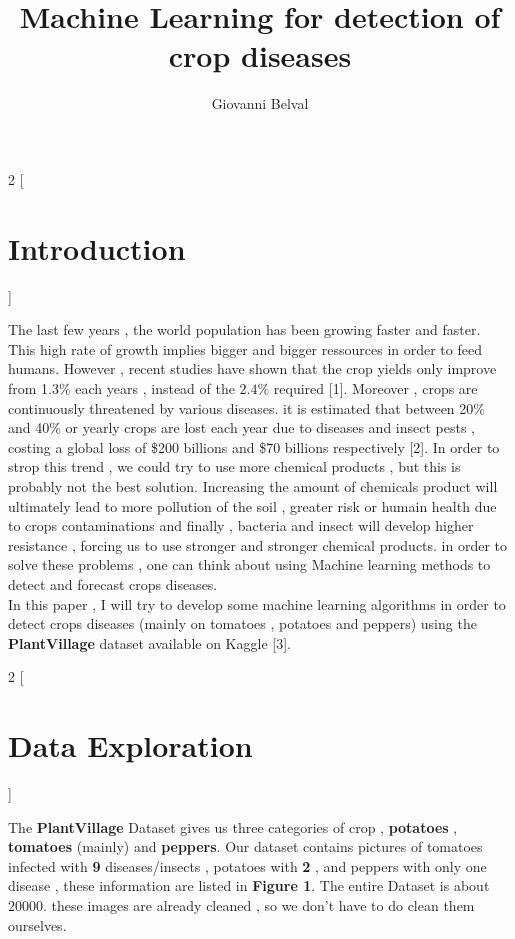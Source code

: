 \documentclass{article}
\title{\textbf{Machine Learning for detection of crop diseases}}
\author{Giovanni Belval}
\date{}
\begin{document}
\maketitle
\newpage

\begin{multicols}{2}
[
\section{Introduction}
]

The last few years , the world population has been growing faster and faster. This high rate of growth implies bigger and bigger ressources in order to feed humans. However , recent studies have shown that the crop yields only improve from 1.3$\%$ each years , instead of the $2.4\%$ required [1]. Moreover ,  crops are continuously threatened by various diseases. it is estimated that between 20\% and 40\% or yearly crops are lost each year due to diseases and insect pests , costing a global loss of \$200 billions and \$70 billions respectively [2]. In order to strop this trend , we could try to use more chemical products , but this is probably not the best solution. Increasing the amount of chemicals product will ultimately lead to more pollution of the soil , greater risk or humain health due to crops contaminations and finally , bacteria and insect will develop higher resistance , forcing us to use stronger and stronger chemical products.
in order to solve these problems , one can think about using Machine learning methods to detect and forecast crops diseases.\\
In this paper , I will try to develop some machine learning algorithms in order to detect crops diseases (mainly on tomatoes , potatoes and peppers) using the \textbf{PlantVillage} dataset  available on Kaggle [3].

\end{multicols}

\begin{multicols}{2}
[
\section{Data Exploration}
]

The \textbf{PlantVillage} Dataset gives us three categories of crop , \textbf{potatoes} ,  \textbf{tomatoes} (mainly) and  \textbf{peppers}. Our dataset contains pictures of tomatoes infected with \textbf{9} diseases/insects , potatoes with \textbf{2} , and peppers with only one disease , these information are listed in \textbf{Figure 1}. The entire Dataset is about $20000$. these images are already cleaned , so we don't have to do clean them ourselves.

\end{multicols}
\end{document}
